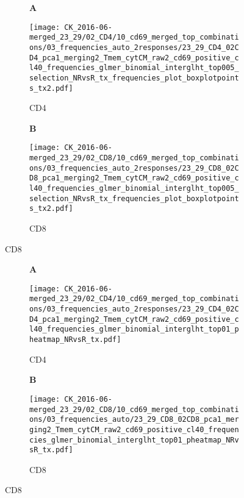 \documentclass[a4paper, 12pt]{article}
\begin{document}
\begin{figure}[!thb]
\centering
    
    \caption{}
    \begin{subfigure}[t]{0.02\textwidth}
    \vskip 0pt
        \textbf{\textsf{\normalsize A}}
    \end{subfigure}
    \begin{subfigure}[t]{0.45\textwidth}
    \vskip 0pt
    \caption{CD4}
        \texttt{[image: CK\_2016-06-merged\_23\_29/02\_CD4/10\_cd69\_merged\_top\_combinations/03\_frequencies\_auto\_2responses/23\_29\_CD4\_02CD4\_pca1\_merging2\_Tmem\_cytCM\_raw2\_cd69\_positive\_cl40\_frequencies\_glmer\_binomial\_interglht\_top005\_selection\_NRvsR\_tx\_frequencies\_plot\_boxplotpoints\_tx2.pdf]}
    \end{subfigure}
\quad
    \begin{subfigure}[t]{0.02\textwidth}
    \vskip 0pt
        \textbf{\textsf{\normalsize B}}
    \end{subfigure}
    \begin{subfigure}[t]{0.45\textwidth}
    \vskip 0pt
    \caption{CD8}
        \texttt{[image: CK\_2016-06-merged\_23\_29/02\_CD8/10\_cd69\_merged\_top\_combinations/03\_frequencies\_auto\_2responses/23\_29\_CD8\_02CD8\_pca1\_merging2\_Tmem\_cytCM\_raw2\_cd69\_positive\_cl40\_frequencies\_glmer\_binomial\_interglht\_top005\_selection\_NRvsR\_tx\_frequencies\_plot\_boxplotpoints\_tx2.pdf]}
    \end{subfigure}
    
\end{figure}




\clearpage


\begin{figure}[!thb]
\centering
    
    \caption{Significant cytokine combinations for TX - FDR = 10\%}
    \begin{subfigure}[t]{0.02\textwidth}
    \vskip 0pt
        \textbf{\textsf{\normalsize A}}
    \end{subfigure}
    \begin{subfigure}[t]{0.45\textwidth}
    \vskip 0pt
    \caption{CD4}
        \texttt{[image: CK\_2016-06-merged\_23\_29/02\_CD4/10\_cd69\_merged\_top\_combinations/03\_frequencies\_auto\_2responses/23\_29\_CD4\_02CD4\_pca1\_merging2\_Tmem\_cytCM\_raw2\_cd69\_positive\_cl40\_frequencies\_glmer\_binomial\_interglht\_top01\_pheatmap\_NRvsR\_tx.pdf]}
    \end{subfigure}
\quad
    \begin{subfigure}[t]{0.02\textwidth}
    \vskip 0pt
        \textbf{\textsf{\normalsize B}}
    \end{subfigure}
    \begin{subfigure}[t]{0.45\textwidth}
    \vskip 0pt
    \caption{CD8}
        \texttt{[image: CK\_2016-06-merged\_23\_29/02\_CD8/10\_cd69\_merged\_top\_combinations/03\_frequencies\_auto/23\_29\_CD8\_02CD8\_pca1\_merging2\_Tmem\_cytCM\_raw2\_cd69\_positive\_cl40\_frequencies\_glmer\_binomial\_interglht\_top01\_pheatmap\_NRvsR\_tx.pdf]}
    \end{subfigure}
    
    
\end{figure}
\end{document}
